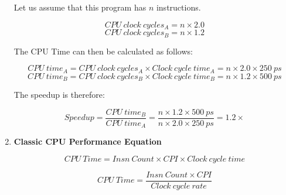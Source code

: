 \documentclass[12pt]{article}
\begin{document}
\begin{enumerate}
    Let us assume that this program has $n$ instructions.
    
    \begin{equation*}
        CPU\ clock\ cycles_{A} = n \times 2.0
    \end{equation*}
    \begin{equation*}
        CPU\ clock\ cycles_{B} = n \times 1.2
    \end{equation*}
    
    The CPU Time can then be calculated as follows:
    
    \begin{equation*}
        CPU\ time_{A} = CPU\ clock\ cycles_{A} \times Clock\ cycle\ time_{A} = n \times 2.0 \times 250\ ps
    \end{equation*}
    \begin{equation*}
        CPU\ time_{B} = CPU\ clock\ cycles_{B} \times Clock\ cycle\ time_{B} = n \times 1.2 \times 500\ ps
    \end{equation*}    
    
    The speedup is therefore:
    
    \begin{equation*}
        Speedup = \frac{CPU\ time_{B}}{CPU\ time_{A}} = \frac{n \times 1.2 \times 500\ ps}{n \times 2.0 \times 250\ ps} = 1.2 \times 
    \end{equation*}
    
    \item \textbf{Classic CPU Performance Equation}
    
    \begin{equation}
        CPU\ Time = Insn\ Count \times CPI \times Clock\ cycle\ time
    \end{equation}
    
    \begin{equation}
        CPU\ Time = \frac{Insn\ Count \times CPI}{Clock\ cycle\ rate}
    \end{equation}
    
\end{enumerate}
\end{document}
